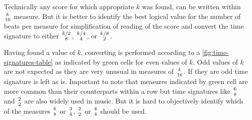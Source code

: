 Technically any score for which appropriate $k$ was found, can be written within $k\atop16$ measure. But it is better to
identify the best logical value for the number of beats per measure for simplification of reading of the score and
convert the time signature to either $k/2\atop8$, $k/4\atop4$, or $k/8\atop2$.

Having found a value of $k$, converting is performed according to a \cref{fig:time-signatures-table} as indicated by
green cells for even values of $k$. Odd values of $k$ are not expected as they are very unusual in measures of
$k\atop16$. If they are odd time signature is left as is. Important to note that measures indicated by green cell are
more common than their counterparts within a row but time signatures like $6\atop8$ and $2\atop2$ are also widely used
in music. But it is hard to objectively identify which of the measures $6\atop8$ or $3\atop4$, $2\atop2$ or $4\atop4$
should be used.

